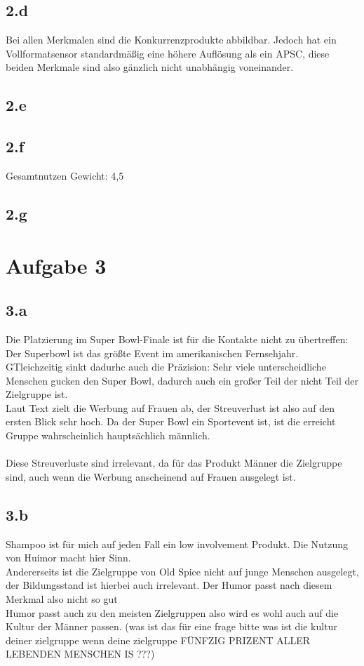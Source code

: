 \subsection{2.d}
    Bei allen Merkmalen sind die Konkurrenzprodukte abbildbar.
    Jedoch hat ein Vollformatsensor standardmäßig eine höhere Auflösung als ein APSC, diese beiden Merkmale sind also gänzlich nicht unabhängig voneinander.

\subsection{2.e}

\subsection{2.f}
    Gesamtnutzen Gewicht: 4,5

\subsection{2.g}



\section{Aufgabe 3}
\subsection{3.a}
    Die Platzierung im Super Bowl-Finale ist für die Kontakte nicht zu übertreffen: Der Superbowl ist das größte Event im amerikanischen Fernsehjahr. \\
    GTleichzeitig sinkt dadurhc auch die Präzision: Sehr viele unterscheidliche Menschen gucken den Super Bowl, dadurch auch ein großer Teil der nicht Teil der Zielgruppe ist. \\
    Laut Text zielt die Werbung auf Frauen ab, der Streuverlust ist also auf den ersten Blick sehr hoch.
    Da der Super Bowl ein Sportevent ist, ist die erreicht Gruppe wahrscheinlich hauptsächlich männlich. \\
    \ \\
    Diese Streuverluste sind irrelevant, da für das Produkt Männer die Zielgruppe sind, auch wenn die Werbung anscheinend auf Frauen ausgelegt ist. \\

\subsection{3.b}
    Shampoo ist für mich auf jeden Fall ein low involvement Produkt. Die Nutzung von Huimor macht hier Sinn. \\
    Andererseits ist die Zielgruppe von Old Spice nicht auf junge Menschen ausgelegt, der Bildungsstand ist hierbei auch irrelevant. Der Humor passt nach diesem Merkmal also nicht so gut\\
    Humor passt auch zu den meisten Zielgruppen also wird es wohl auch auf die Kultur der Männer passen. (was ist das für eine frage bitte was ist die kultur deiner zielgruppe wenn deine zielgruppe FÜNFZIG PRIZENT ALLER LEBENDEN MENSCHEN IS ???)

